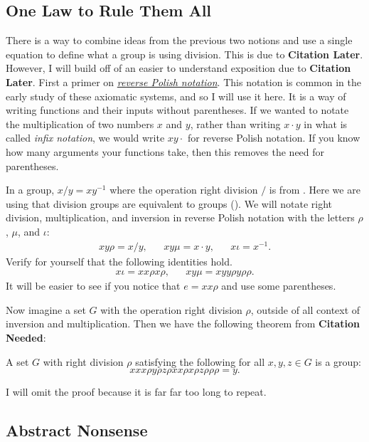 \documentclass{article}
\begin{document}
\subsection*{One Law to Rule Them All}

There is a way to combine ideas from the previous two notions and use a single equation to define what a group is using division.
This is due to \textbf{Citation Later}.
However, I will build off of an easier to understand exposition due to \textbf{Citation Later}.
First a primer on \href{https://en.wikipedia.org/wiki/Reverse_Polish_notation}{\emph{reverse Polish notation}}.
This notation is common in the early study of these axiomatic systems, and so I will use it here.
It is a way of writing functions and their inputs without parentheses.
If we wanted to notate the multiplication of two numbers $x$ and $y$, rather than writing $x \cdot y$ in what is called \emph{infix notation}, we would write $x y \cdot$ for reverse Polish notation.
If you know how many arguments your functions take, then this removes the need for parentheses.

In a group, $x / y = x y^{-1}$ where the operation right division $/$ is from .
Here we are using that division groups are equivalent to groups ().
We will notate right division, multiplication, and inversion in reverse Polish notation with the letters $\rho$, $\mu$, and $\iota$:
\begin{align*}
  x y \rho = x / y, && x y \mu = x \cdot y, && x \iota = x^{-1}.
\end{align*}
Verify for yourself that the following identities hold.
\begin{align*}
  x \iota = x x \rho x \rho, && x y \mu = x y y \rho y \rho \rho.
\end{align*}
It will be easier to see if you notice that $e = x x \rho$ and use some parentheses.

Now imagine a set $G$ with the operation right division $\rho$, outside of all context of inversion and multiplication.
Then we have the following theorem from \textbf{Citation Needed}:
\begin{theorem}
  A set $G$ with right division $\rho$ satisfying the following for all $x, y, z \in G$ is a group:
  \[
    x x x \rho y \rho z \rho x x \rho x \rho z \rho \rho \rho = y.
  \]
\end{theorem}
I will omit the proof because it is far far too long to repeat.

\subsection*{Abstract Nonsense}
\end{document}
